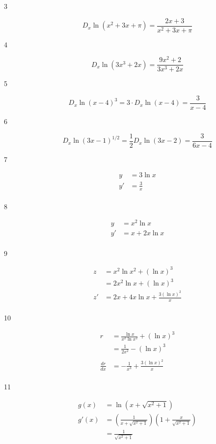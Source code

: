 \documentclass{exam}
\begin{document}
\begin{description}
\item[3]
\[
  D_x \ln(x^2 + 3x + \pi) = \frac{2x + 3}{x^2 + 3x + \pi}
\]

\item[4]
\[
  D_x \ln(3x^3 + 2x) = \frac{9x^2 + 2}{3x^3 + 2x}
\]

\item[5]
\[
  D_x \ln(x - 4)^3 = 3 \cdot D_x \ln(x - 4) = \frac{3}{x - 4}
\]

\item[6]
\[
  D_x \ln (3x - 1)^{1/2} = \frac{1}{2} D_x \ln(3x - 2) = \frac{3}{6x - 4}
\]

\item[7]
\begin{align*}
  y &= 3 \ln x \\
  y' &= \frac{3}{x} \\
\end{align*}

\item[8]
\begin{align*}
  y &= x^2 \ln x \\
  y' &= x + 2x \ln x \\
\end{align*}

\item[9]
\begin{align*}
  z &= x^2 \ln x^2 + (\ln x)^3 \\
    &= 2 x^2 \ln x + (\ln x)^3\\
  z' &= 2x + 4x \ln x + \frac{3 (\ln x)^2}{x} \\
\end{align*}

\item[10]
\begin{align*}
  r &= \frac{\ln x}{x^2 \ln x^2} + \left( \ln x \right)^3 \\
    &= \frac{1}{2x^2} - (\ln x)^3 \\
\\
  \frac{dr}{dx} &= -\frac{1}{x^3} + \frac{3 (\ln x)^2}{x} \\
\end{align*}

\item[11]
\begin{align*}
  g(x) &= \ln ( x + \sqrt{x^2 + 1} ) \\
  g'(x) &= \left( \frac{1}{x + \sqrt{x^2 + 1}} \right) \left(1 + \frac{x}{\sqrt{x^2 + 1}} \right) \\
        &= \frac{1}{\sqrt{x^2 + 1}}
\end{align*}


\end{description}
\end{document}
